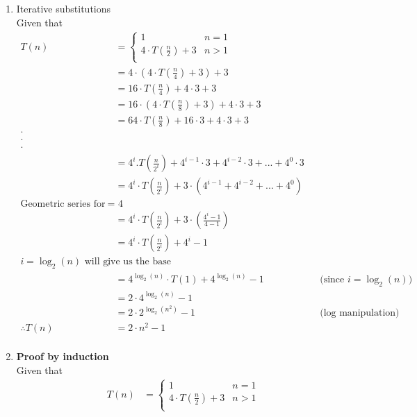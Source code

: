 \documentclass[a4paper,11pt]{article}
\theoremstyle{quest}
\newenvironment{solution}[2][Solution]{\begin{trivlist}
		\item[\hskip \labelsep {\bfseries #1}\hskip \labelsep {\bfseries #2.}]}{\end{trivlist}}
\begin{document}
\newpage
\begin{solution}1
	\begin{enumerate}
		\item Iterative substitutions \\
		Given that 
		\begin{align*}
		T(n)&=\begin{cases}
		1 & \text{$n = 1$}\\
		4 \cdot T(\frac{n}{2}) + 3 & \text{$n > 1$} \\
		\end{cases}\\
		&= 4 \cdot (4 \cdot T(\frac{n}{4})+ 3) + 3 \\
		&= 16 \cdot T(\frac{n}{4}) + 4 \cdot 3 + 3 \\
		&= 16 \cdot (4 \cdot T(\frac{n}{8})+ 3) + 4 \cdot 3 + 3 \\
		&= 64 \cdot T(\frac{n}{8}) + 16 \cdot 3 + 4 \cdot 3 + 3 \\
		\cdot \\
		\cdot \\
		\cdot \\
		&= 4^{i}.T(\frac{n}{2^{i}}) + 4^{i-1} \cdot 3 + 4^{i-2} \cdot 3 + ...+ 4^{0} \cdot 3 \\
		&= 4^{i}\cdot T(\frac{n}{2^{i}}) + 3\cdot(4^{i-1} + 4^{i-2} + ...+ 4^{0}) \\
		\text{Geometric series for ratio r $=$ 4} \\
		&= 4^{i}\cdot T(\frac{n}{2^{i}}) + 3\cdot(\frac{4^{i} - 1}{4-1} )\\
		&= 4^{i}\cdot T(\frac{n}{2^{i}}) + {4^{i} - 1}\\
		\text {$i = \log_2(n)$ will give us the base case},\\
		&= 4^{\log_2(n)}\cdot T(1) + 4^{\log_2(n)} -1 && \text{(since $i = \log_2(n)$)}\\
		&= 2 \cdot 4^{\log_2(n)} -1\\
		&= 2\cdot 2^{\log_2(n^{2})} -1 && \text{(log manipulation)}\\
		\therefore	T(n)&= 2 \cdot n^{2} - 1 \\	
		\end{align*}
		
		\item
		\textbf{Proof by induction}\\
		Given that 
		\begin{align*}
		T(n)&=\begin{cases}
		1 & \text{$n = 1$}\\
		4 \cdot T(\frac{n}{2}) + 3 & \text{$n > 1$} \\
		\end{cases}
		\end{align*}
		

\end{enumerate}
\end{solution}
\end{document}
